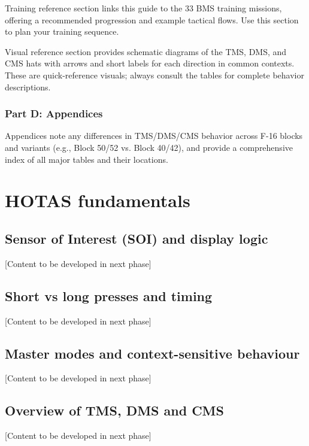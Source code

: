 \documentclass[11pt, a4paper, twoside]{report}
\begin{document}
Training reference section links this guide to the 33 BMS training missions, offering a recommended progression and example tactical flows. Use this section to plan your training sequence.

Visual reference section provides schematic diagrams of the TMS, DMS, and CMS hats with arrows and short labels for each direction in common contexts. These are quick-reference visuals; always consult the tables for complete behavior descriptions.

\subsection{Part D: Appendices}
\label{sec:C1-S5-S4}

Appendices note any differences in TMS/DMS/CMS behavior across F-16 blocks and variants (e.g., Block 50/52 vs. Block 40/42), and provide a comprehensive index of all major tables and their locations.
\newpage
\chapter{HOTAS fundamentals}
\label{chap:C2}

\section{Sensor of Interest (SOI) and display logic}
\label{sec:C2-S1}
[Content to be developed in next phase]

\section{Short vs long presses and timing}
\label{sec:C2-S2}
[Content to be developed in next phase]

\section{Master modes and context-sensitive behaviour}
\label{sec:C2-S3}
[Content to be developed in next phase]

\section{Overview of TMS, DMS and CMS}
\label{sec:C2-S4}
[Content to be developed in next phase]
\newpage
\end{document}

